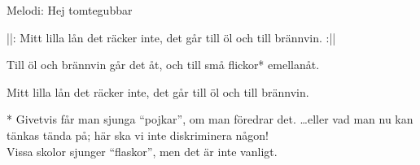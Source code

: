 \begin{song}

\begin{songmeta}
Melodi: Hej tomtegubbar
\end{songmeta}

\begin{songtext}
||: Mitt lilla lån det räcker inte,
det går till öl och till brännvin. :||

Till öl och brännvin går det åt,
och till små flickor* emellanåt.

Mitt lilla lån det räcker inte,
det går till öl och till brännvin.
\end{songtext}

\begin{songnotes}
* Givetvis får man sjunga \textquotedblleft{}pojkar\textquotedblright{}, om man föredrar det.
\ldots{}eller vad man nu kan tänkas tända på; här ska vi inte diskriminera någon!\\
Vissa skolor sjunger \textquotedblleft{}flaskor\textquotedblright{}, men det är inte vanligt.
\end{songnotes}

\end{song}
